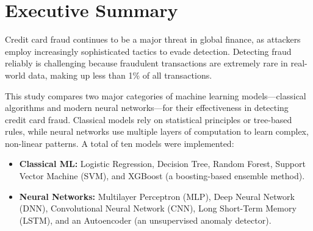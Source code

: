 \documentclass[journal]{IEEEtran}
\begin{document}
\begin{abstract}
This project compares classical machine learning algorithms with modern neural network architectures for credit card fraud detection. Using a highly imbalanced, anonymized dataset of 284,807 transactions (0.17\% fraud), I implemented five models from each paradigm and evaluated all ten on the same held-out test set of 85,443 transactions. Unlike many studies, this work preserves the original class imbalance (no oversampling or undersampling) and handles it with class weighting instead. It also includes an unsupervised autoencoder trained only on legitimate transactions, showing what is achievable when fraud labels are unavailable. Models were assessed with accuracy, precision, recall, F1-score, ROC AUC and precision--recall AUC. The classical ensembles performed best overall: XGBoost achieved the highest ROC AUC (<<xgboost.roc_auc>>) and Random Forest the highest F1-score (<<random_forest.f1>>) and PR AUC (<<random_forest.pr_auc>>). The neural networks caught a similar share of fraud (recall <<lstm.recall:pct>>--<<dnn.recall:pct>>) but with far more false alarms and lower ROC AUC (<<lstm.roc_auc>>--<<cnn.roc_auc>>), while training 20 to 160 times longer than XGBoost. The study concludes that, on structured tabular data of this kind, well-configured classical ensembles are the stronger and more practical choice.
\end{abstract}

\section{Executive Summary}
Credit card fraud continues to be a major threat in global finance, as attackers employ increasingly sophisticated tactics to evade detection. Detecting fraud reliably is challenging because fraudulent transactions are extremely rare in real-world data, making up less than 1\% of all transactions.

This study compares two major categories of machine learning models---classical algorithms and modern neural networks---for their effectiveness in detecting credit card fraud. Classical models rely on statistical principles or tree-based rules, while neural networks use multiple layers of computation to learn complex, non-linear patterns. A total of ten models were implemented:
\begin{itemize}
  \item \textbf{Classical ML:} Logistic Regression, Decision Tree, Random Forest, Support Vector Machine (SVM), and XGBoost (a boosting-based ensemble method).
  \item \textbf{Neural Networks:} Multilayer Perceptron (MLP), Deep Neural Network (DNN), Convolutional Neural Network (CNN), Long Short-Term Memory (LSTM), and an Autoencoder (an unsupervised anomaly detector).
\end{itemize}
\end{document}
